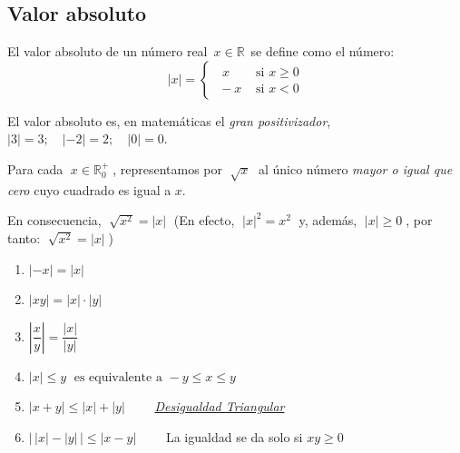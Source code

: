 		
	
	
	\subsection{Valor absoluto}
	
	\begin{defi} El valor absoluto de un número real $\, x\in \mathbb R\, $ se define como el número:
	\begin{equation}
		|x|=
		\begin{cases} 
		\;\;  x &\mbox{ si } x\ge 0 \\ 
		\; -x & \mbox{ si } x<0 
		\end{cases}
	\end{equation}	
	\end{defi}
		El valor absoluto es, en matemáticas el \textit{gran positivizador}, $|3|=3;\quad |-2|=2; \quad |0|=0$.
	
	\begin{defi}
	Para cada $\; x\in \mathbb R^+_0\; $, representamos	por $\; \sqrt x\; $ al único número \emph{mayor o igual que cero} cuyo cuadrado es igual a $x$.
	\end{defi}
	En consecuencia, $\; \sqrt {x^2}=|x|\; $ (En efecto, $\;|x|^2=x^2 \; $ y, además, $\;|x| \ge 0 \; $, por tanto: $\; \sqrt {x^2}=|x|\; $)
	
	\begin{teor} 	
	\end{teor}
		\begin{enumerate}
		\item $|-x|=|x|$
		\item $|xy|=|x|\cdot|y|$
		\item $\left| \dfrac x y \right| = \dfrac {|x|}{|y|}$
		\item $|x|\le y\;  \mbox{ es equivalente a } -y\le x \le y $
		\item $|x+y|\le|x|+|y|\qquad$ \emph{\underline{Desigualdad Triangular}}
		\item $\left|\,  {|x|-|y|}\,  \right| \le|x-y|\qquad$ La igualdad se da solo si $xy\ge 0$ 
	\end{enumerate}
	
